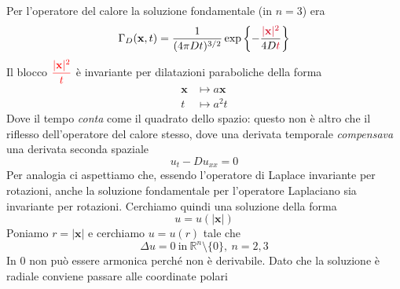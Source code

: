 \documentclass[10pt,a4paper,twoside,openright]{book}
\newcommand{\x}{\mathbf{x}}
\begin{document}
Per l'operatore del calore la soluzione fondamentale (in $n=3$) era
\begin{equation*}
    \Gamma _{D}(\x,t) =\frac{1}{(4\pi Dt)^{3/2}}\exp\left\{-\frac{\textcolor[rgb]{0.82,0.01,0.11}{|\x|^{2}}}{4D\textcolor[rgb]{0.82,0.01,0.11}{t}}\right\}
\end{equation*}
Il blocco $\displaystyle \textcolor[rgb]{1,0,0}{\frac{|\x|^{2}}{t}}$ è invariante per dilatazioni paraboliche della forma
\begin{align*}
    \x & \longmapsto a\x     \\
    t  & \longmapsto a^{2} t
\end{align*}
Dove il tempo \textit{conta} come il quadrato dello spazio: questo non è altro che il riflesso dell'operatore del calore stesso, dove una derivata temporale \textit{compensava} una derivata seconda spaziale
\begin{equation*}
    u_{t} -Du_{xx} =0
\end{equation*}
Per analogia ci aspettiamo che, essendo l'operatore di Laplace invariante per rotazioni, anche la soluzione fondamentale per l'operatore Laplaciano sia invariante per rotazioni. Cerchiamo quindi una soluzione della forma
\begin{equation*}
    u=u(|\x|)
\end{equation*}
Poniamo $\displaystyle r=|\x| $ e cerchiamo $\displaystyle u=u(r)$ tale che
\begin{equation*}
    \Delta u=0\ \text{in} \ \mathbb{R}^{n} \setminus \{0\},\ n=2,3
\end{equation*}
In $0$ non può essere armonica perché non è derivabile. Dato che la soluzione è radiale conviene passare alle coordinate polari
\end{document}
